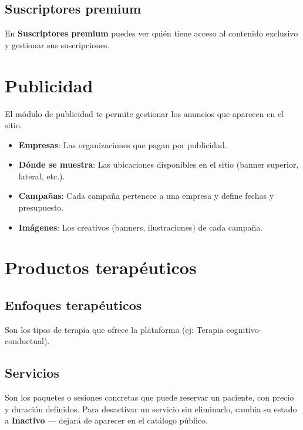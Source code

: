 \documentclass[12pt,a4paper]{article}
\begin{document}
\subsection{Suscriptores premium}

En \textbf{Suscriptores premium} puedes ver quién tiene acceso al contenido
exclusivo y gestionar sus suscripciones.

\section{Publicidad}

El módulo de publicidad te permite gestionar los anuncios que aparecen en el sitio.

\begin{itemize}
  \item \textbf{Empresas}: Las organizaciones que pagan por publicidad.
  \item \textbf{Dónde se muestra}: Las ubicaciones disponibles en el sitio (banner superior, lateral, etc.).
  \item \textbf{Campañas}: Cada campaña pertenece a una empresa y define fechas y presupuesto.
  \item \textbf{Imágenes}: Los creativos (banners, ilustraciones) de cada campaña.
\end{itemize}

\section{Productos terapéuticos}

\subsection{Enfoques terapéuticos}
Son los tipos de terapia que ofrece la plataforma (ej: Terapia cognitivo-conductual).

\subsection{Servicios}
Son los paquetes o sesiones concretas que puede reservar un paciente, con precio
y duración definidos. Para desactivar un servicio sin eliminarlo, cambia su estado
a \textbf{Inactivo} — dejará de aparecer en el catálogo público.

\end{document}
